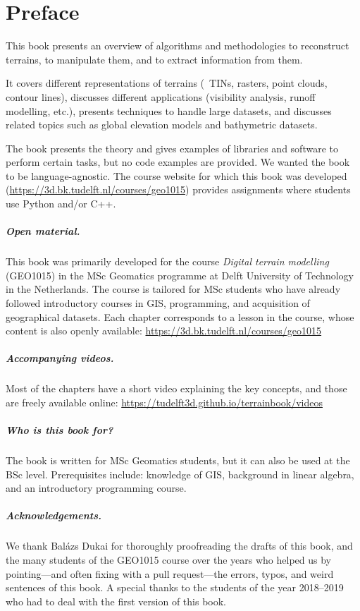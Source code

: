 
\chapter*{Preface}

This book presents an overview of algorithms and methodologies to reconstruct terrains, to manipulate them, and to extract information from them.

It covers different representations of terrains (\eg\ TINs, rasters, point clouds, contour lines), discusses different applications (visibility analysis, runoff modelling, etc.), presents techniques to handle large datasets, and discusses related topics such as global elevation models and bathymetric datasets.

The book presents the theory and gives examples of libraries and software to perform certain tasks, but no code examples are provided.
We wanted the book to be language-agnostic.
The course website for which this book was developed (\url{https://3d.bk.tudelft.nl/courses/geo1015}) provides assignments where students use Python and/or C++.


\paragraph*{Open material.}
This book was primarily developed for the course \emph{Digital terrain modelling} (GEO1015) in the MSc Geomatics programme at Delft University of Technology in the Netherlands.
The course is tailored for MSc students who have already followed introductory courses in GIS, programming, and acquisition of geographical datasets.
Each chapter corresponds to a lesson in the course, whose content is also openly available: \url{https://3d.bk.tudelft.nl/courses/geo1015}


\paragraph*{Accompanying videos.}
Most of the chapters have a short video explaining the key concepts, and those are freely available online: \url{https://tudelft3d.github.io/terrainbook/videos}


\paragraph*{Who is this book for?}
The book is written for MSc Geomatics students, but it can also be used at the BSc level.
Prerequisites include: knowledge of GIS, background in linear algebra, and an introductory programming course.


\paragraph*{Acknowledgements.}
We thank Balázs Dukai for thoroughly proofreading the drafts of this book, and the many students of the GEO1015 course over the years who helped us by pointing---and often fixing with a pull request---the errors, typos, and weird sentences of this book. 
A special thanks to the students of the year 2018--2019 who had to deal with the first version of this book.
